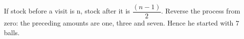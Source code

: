 If stock before a visit is n, stock after it is $\dfrac{(n-1)}{2}$. Reverse the process from zero: the preceding amounts are one, three and seven. Hence he started with $\boxed7$ balls.
